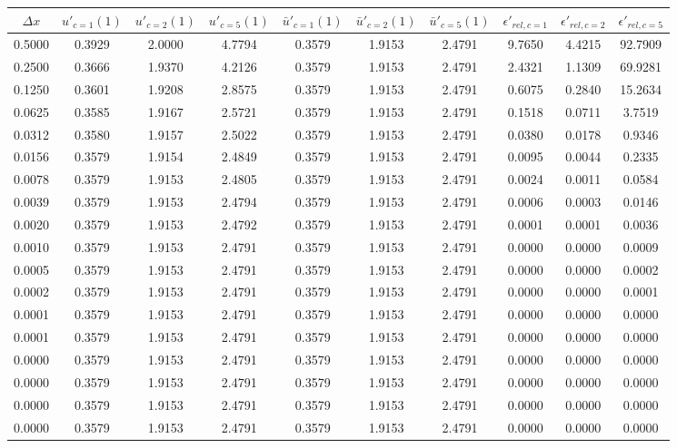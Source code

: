 \begin{tabular}{|c|c|c|c|c|c|c|c|c|c|}
\hline
\textbf{$\Delta x$}&\textbf{$u'_{c=1}(1)$}&\textbf{$u'_{c=2}(1)$}&\textbf{$u'_{c=5}(1)$}&\textbf{$\bar{u}'_{c=1}(1)$}&\textbf{$\bar{u}'_{c=2}(1)$}&\textbf{$\bar{u}'_{c=5}(1)$}&\textbf{$\epsilon'_{rel,c=1}$}&\textbf{$\epsilon'_{rel,c=2}$}&\textbf{$\epsilon'_{rel,c=5}$}\\\hline
0.5000&0.3929&2.0000&4.7794&0.3579&1.9153&2.4791&9.7650&4.4215&92.7909\\\hline
0.2500&0.3666&1.9370&4.2126&0.3579&1.9153&2.4791&2.4321&1.1309&69.9281\\\hline
0.1250&0.3601&1.9208&2.8575&0.3579&1.9153&2.4791&0.6075&0.2840&15.2634\\\hline
0.0625&0.3585&1.9167&2.5721&0.3579&1.9153&2.4791&0.1518&0.0711&3.7519\\\hline
0.0312&0.3580&1.9157&2.5022&0.3579&1.9153&2.4791&0.0380&0.0178&0.9346\\\hline
0.0156&0.3579&1.9154&2.4849&0.3579&1.9153&2.4791&0.0095&0.0044&0.2335\\\hline
0.0078&0.3579&1.9153&2.4805&0.3579&1.9153&2.4791&0.0024&0.0011&0.0584\\\hline
0.0039&0.3579&1.9153&2.4794&0.3579&1.9153&2.4791&0.0006&0.0003&0.0146\\\hline
0.0020&0.3579&1.9153&2.4792&0.3579&1.9153&2.4791&0.0001&0.0001&0.0036\\\hline
0.0010&0.3579&1.9153&2.4791&0.3579&1.9153&2.4791&0.0000&0.0000&0.0009\\\hline
0.0005&0.3579&1.9153&2.4791&0.3579&1.9153&2.4791&0.0000&0.0000&0.0002\\\hline
0.0002&0.3579&1.9153&2.4791&0.3579&1.9153&2.4791&0.0000&0.0000&0.0001\\\hline
0.0001&0.3579&1.9153&2.4791&0.3579&1.9153&2.4791&0.0000&0.0000&0.0000\\\hline
0.0001&0.3579&1.9153&2.4791&0.3579&1.9153&2.4791&0.0000&0.0000&0.0000\\\hline
0.0000&0.3579&1.9153&2.4791&0.3579&1.9153&2.4791&0.0000&0.0000&0.0000\\\hline
0.0000&0.3579&1.9153&2.4791&0.3579&1.9153&2.4791&0.0000&0.0000&0.0000\\\hline
0.0000&0.3579&1.9153&2.4791&0.3579&1.9153&2.4791&0.0000&0.0000&0.0000\\\hline
0.0000&0.3579&1.9153&2.4791&0.3579&1.9153&2.4791&0.0000&0.0000&0.0000\\\hline
\end{tabular}
